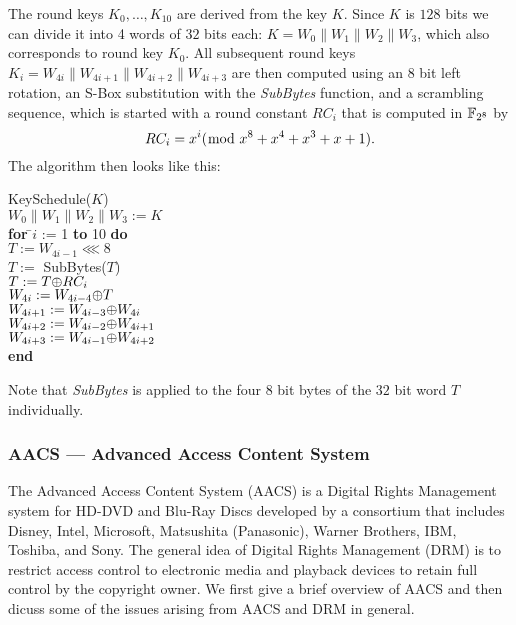 The round keys $K_0,\ldots,K_{10}$ are derived from the key $K$. Since $K$ is
$128$ bits we can divide it into 4 words of $32$ bits each:
$K=W_0\|W_1\|W_2\|W_3$, which also corresponds to round key $K_0$. All
subsequent round keys $K_i=W_{4i}\|W_{4i+1}\|W_{4i+2}\|W_{4i+3}$ are then
computed using an $8$ bit left rotation, an S-Box substitution with the
\textit{SubBytes} function, and a scrambling sequence, which is started with a
round constant $RC_i$ that is computed in ${ \mathbb{F}_{2^8}}$ by \[{RC_i}=x^i
({\bmod}\; x^8+x^4+x^3+x+1).\] The algorithm then looks like this:
\begin{center}
  \begin{minipage}{1.0\linewidth}
    \begin{tabbing}
      KeySchedule($K$)\\[.2cm]
      $W_0\|W_1\|W_2\|W_3 := K$\\
      \textbf{for} \=$i$ := 1 \textbf{to} 10 \textbf{do}\\
      \>$T := W_{4i-1}\lll 8$\\
      \>$T :=$ SubBytes($T$)\\
      \>$T := T {\oplus} RC_i$\\
      \>$W_{4i} := W_{4i-4} {\oplus} T$\\
      \>$W_{4i+1} := W_{4i-3} {\oplus} W_{4i}$\\
      \>$W_{4i+2} := W_{4i-2} {\oplus} W_{4i+1}$\\
      \>$W_{4i+3} := W_{4i-1} {\oplus} W_{4i+2}$\\
      \textbf{end}
    \end{tabbing}
  \end{minipage}
\end{center}

Note that \textit{SubBytes} is applied to the four $8$ bit bytes of the $32$ bit
word $T$ individually.

\newpage
\subsubsection{AACS --- Advanced Access Content System}

The Advanced Access Content System (AACS) is a Digital Rights Management system
for HD-DVD and Blu-Ray Discs developed by a consortium that includes Disney,
Intel, Microsoft, Matsushita (Panasonic), Warner Brothers, IBM, Toshiba, and
Sony. The general idea of Digital Rights Management (DRM) is to restrict access
control to electronic media and playback devices to retain full control by the
copyright owner. We first give a brief overview of AACS and then dicuss some of
the issues arising from AACS and DRM in general.

